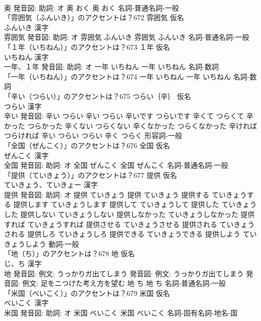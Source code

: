 \documentclass[8pt]{extreport}
\begin{document}
\begin{CJK}{UTF8}{min}
\\	奥 発音図: 助詞: オ	奥 おく		奥 おく				名詞-普通名詞-一般 
\\	「雰囲気（ふんいき）」のアクセントは？672	雰囲気 仮名　
\\	ふんいき 漢字　
\\	雰囲気 発音図: 助詞: オ	雰囲気 ふんいき		雰囲気 ふんいき				名詞-普通名詞-一般 
\\	「１年（いちねん）」のアクセントは？673	１年 仮名　
\\	いちねん 漢字　
\\	一年、１年 発音図: 助詞: オ	一年 いちねん		一年 いちねん				名詞-数詞 
\\	「一年（いちねん）」のアクセントは？674		一年 いちねん		一年 いちねん				名詞-数詞 
\\	「辛い（つらい）」のアクセントは？675	つらい｛辛｝ 仮名　
\\	つらい 漢字　
\\	辛い 発音図:	辛い つらい		辛い つらい 辛いです つらいです 辛くて つらくて 辛かった つらかった 辛くない つらくない 辛くなかった つらくなかった 辛ければ つらければ 辛い つらい つらい 辛く つらく				形容詞-一般 
\\	「全国（ぜんこく）」のアクセントは？676	全国 仮名　
\\	ぜんこく 漢字　
\\	全国 発音図: 助詞: オ	全国 ぜんこく		全国 ぜんこく				名詞-普通名詞-一般 
\\	「提供（ていきょう）」のアクセントは？677	提供 仮名　
\\	ていきょう、ていきょー 漢字　
\\	提供 発音図: 助詞: オ	提供 ていきょう		提供 ていきょう 提供する ていきょうする 提供します ていきょうします 提供して ていきょうして 提供した ていきょうした 提供しない ていきょうしない 提供しなかった ていきょうしなかった 提供すれば ていきょうすれば 提供させる ていきょうさせる 提供される ていきょうされる 提供しろ ていきょうしろ 提供できる ていきょうできる 提供しよう ていきょうしよう				動詞-一般 
\\	「地（ち）」のアクセントは？678	地 仮名　
\\	じ、ち 漢字　
\\	地 発音図: 例文: うっかりガ出てしまう 発音図: 例文: うっかりガ出てしまう 発音図: 例文: 足をニつけた考え方を望む	地 ち		地 ち				名詞-普通名詞-一般 
\\	「米国（べいこく）」のアクセントは？679	米国 仮名　
\\	べいこく 漢字　
\\	米国 発音図: 助詞: オ	米国 べいこく		米国 べいこく				名詞-固有名詞-地名-国 

\end{CJK}
\end{document}
